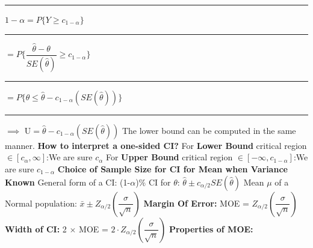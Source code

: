 \documentclass[]{article}
\begin{document}
\newline\Large\rule{3.0cm}{0pt}  $ 1- \alpha =  P \{ Y \ge  c_{1- \alpha}  \}$
\newline
\newline\Large\rule{4.3cm}{0pt}  $=  P \{ \dfrac{\hat{\theta} - \theta}{ SE(\hat{\theta})}  \ge  c_{1- \alpha}   \}$
\newline
\newline\Large\rule{4.3cm}{0pt}  $=  P \{ \theta \le \hat{\theta} -  c_{1- \alpha }(SE(\hat\theta))  \}$
\newline
\newline\Large\rule{2.8cm}{0pt} $\implies$  U$=  \hat{\theta} -  c_{1- \alpha }(SE(\hat\theta))$
\newline The lower bound can be computed in the same manner.
\newline
\newline \textbf{How to interpret a one-sided CI?}
\newline For \textbf{Lower Bound} critical region $\in [ c_{\alpha} ,  \infty ]$:We are sure  $c_{\alpha}$ 
\newline
\newline For \textbf{Upper Bound} critical region $\in [ - \infty , c_{1- \alpha} ]$:We are sure  $c_{1- \alpha}$ 
\newline
\newline
\newline
\newline
\Large\textbf{Choice of Sample Size for CI for Mean when Variance Known }
\newline
\newline General form of a CI:
(1-$\alpha$)$\%$ CI for $\theta$: $\hat{\theta} \pm c_{\alpha / 2} SE(\hat{\theta})$ 
\newline
\newline Mean $\mu$ of a Normal population: $\bar{x} \pm Z_{\alpha / 2 } \left( \dfrac{\sigma}{\sqrt{n}} \right)$
\newline \textbf{Margin Of Error:}  MOE = $Z_{\alpha / 2 } \left( \dfrac{\sigma}{\sqrt{n}} \right)$
\newline
\newline
\newline \textbf{Width of CI:} 2 $\times$ MOE = $2 \cdot Z_{\alpha / 2 } \left( \dfrac{\sigma}{\sqrt{n}} \right)$
\newline
\newline \textbf{Properties of MOE:} 
\end{document}
